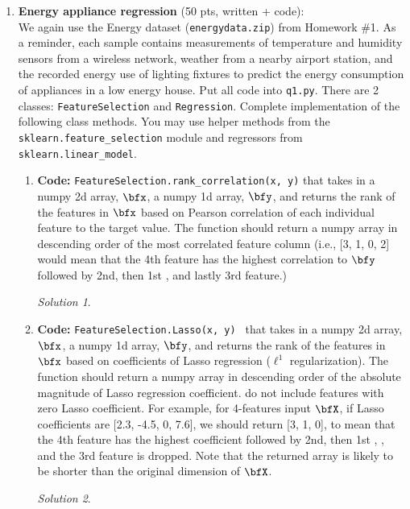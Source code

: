 \documentclass[a4paper,12pt]{article}
\theoremstyle{definition}
\theoremstyle{remark}
\newtheorem*{solution}{Solution}
\begin{document}
	\begin{enumerate}
		\item {\bf Energy appliance regression} (50 pts, written + code):\\
		We again use the Energy dataset ({\tt energydata.zip}) from Homework \#1. As a reminder, each sample contains
		measurements of temperature and humidity sensors from a wireless network, weather from a nearby airport station,
		and the recorded energy use of lighting fixtures to predict the energy consumption of appliances in a low energy
		house. Put all code into \texttt{q1.py}. There are 2 classes: \texttt{FeatureSelection} and \texttt{Regression}. Complete implementation of the following class methods. You may use helper methods from the {\tt sklearn.feature\_selection} module and regressors from {\tt sklearn.linear\_model}.
		\begin{enumerate}
			\item {\bf Code:} {\tt FeatureSelection.rank\_correlation(x, y)} that takes in a numpy 2d array, $\bfx$, a numpy 1d array, $\bfy$, and returns the rank of the features in $\bfx$ based on Pearson correlation of each individual feature to the target value. The function should return a numpy array in descending order of the most correlated feature column (i.e., [3, 1,
			0, 2] would mean that the 4th feature has the highest correlation to $\bfy$ followed by 2nd, then 1st , and lastly 3rd
			feature.)
			\begin{solution}
			\end{solution}
			\item {\bf Code:} {\tt FeatureSelection.Lasso(x, y) } that takes in a numpy 2d array, $\bfx$, a numpy 1d array, $\bfy$, and returns the rank of the features in $\bfx$ based on coefficients of Lasso regression ($\ell^1$ regularization). The function should return a numpy array in descending order of the absolute magnitude of Lasso regression coefficient. do not
			include features with zero Lasso coefficient. For example, for 4-features input $\bfX$, if Lasso coefficients are [2.3,
			-4.5, 0, 7.6], we should return [3, 1, 0], to mean that the 4th feature has the highest coefficient followed by 2nd, then 1st , , and the 3rd feature is dropped. Note that the returned array is likely to be shorter than the original
			dimension of $\bfX$.
			\begin{solution}
			\end{solution}

\end{enumerate}
\end{enumerate}
\end{document}
